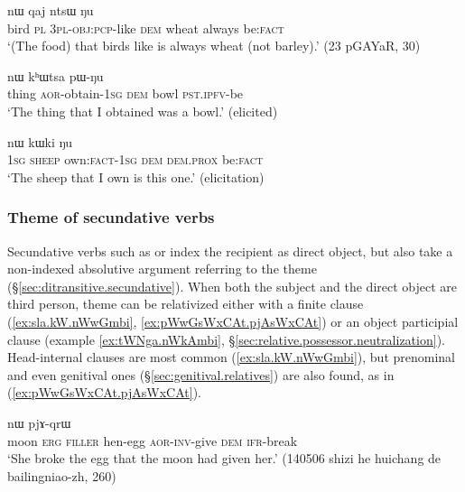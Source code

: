   \begin{exe}
\ex \label{ex:pGa.ra.nWkArga}
 nɯ qaj ntsɯ ŋu   \\
bird \textsc{pl} \textsc{3pl}-\textsc{obj}:\textsc{pcp}-like \textsc{dem} wheat always be:\textsc{fact} \\
  \glt `(The food) that birds like is always wheat (not barley).' (23 pGAYaR, 30)
   \end{exe} 
   
  \begin{exe}
\ex \label{ex:pWBJata.nW}
 nɯ kʰɯtsa pɯ-ŋu \\
thing \textsc{aor}-obtain-\textsc{1sg} \textsc{dem} bowl \textsc{pst}.\textsc{ipfv}-be \\
\glt `The thing that I obtained was a bowl.' (elicited)
   \end{exe} 
   
  \begin{exe}
\ex \label{ex:aroa.nW}
 nɯ kɯki ŋu  \\
\textsc{1sg} \textsc{sheep} own:\textsc{fact}-\textsc{1sg} \textsc{dem} \textsc{dem}.\textsc{prox} be:\textsc{fact} \\
  \glt `The sheep that I own is this one.' (elicitation)
   \end{exe} 
   
 \subsubsection{Theme of secundative verbs}  \label{sec:secundative.theme.relativization}
Secundative verbs such as  or  index the recipient as direct object, but also take a non-indexed absolutive argument referring to the theme (§\ref{sec:ditransitive.secundative}). When both the subject and the direct object are third person, theme can be relativized either with a finite clause (\ref{ex:sla.kW.nWwGmbi}, \ref{ex:pWwGsWxCAt.pjAsWxCAt}) or an object participial clause (example \ref{ex:tWNga.nWkAmbi}, §\ref{sec:relative.possessor.neutralization}).  Head-internal clauses are most common (\ref{ex:sla.kW.nWwGmbi}), but prenominal and even genitival ones (§\ref{sec:genitival.relatives}) are also found, as in (\ref{ex:pWwGsWxCAt.pjAsWxCAt}).
 
\begin{exe}
\ex \label{ex:sla.kW.nWwGmbi}
 nɯ pjɤ-qrɯ \\
moon \textsc{erg} \textsc{filler} hen-egg \textsc{aor}-\textsc{inv}-give \textsc{dem} \textsc{ifr}-break \\
\glt `She broke the egg that the moon had given her.' (140506 shizi he huichang de bailingniao-zh, 260)
\end{exe} 
 
